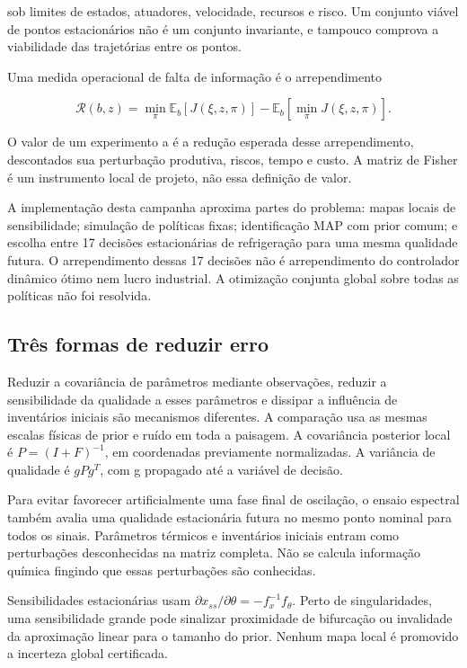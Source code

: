 \documentclass[
  11pt,
  letterpaper,
]{article}
\begin{document}
sob limites de estados, atuadores, velocidade, recursos e risco. Um
conjunto viável de pontos estacionários não é um conjunto invariante, e
tampouco comprova a viabilidade das trajetórias entre os pontos.

Uma medida operacional de falta de informação é o arrependimento

\[
\mathcal R(b,z)=\min_{\pi}\mathbb E_b[J(\xi,z,\pi)]
 -\mathbb E_b[\min_{\pi}J(\xi,z,\pi)] .
\]

O valor de um experimento a é a redução esperada desse arrependimento,
descontados sua perturbação produtiva, riscos, tempo e custo. A matriz
de Fisher é um instrumento local de projeto, não essa definição de
valor.

A implementação desta campanha aproxima partes do problema: mapas locais
de sensibilidade; simulação de políticas fixas; identificação MAP com
prior comum; e escolha entre 17 decisões estacionárias de refrigeração
para uma mesma qualidade futura. O arrependimento dessas 17 decisões não
é arrependimento do controlador dinâmico ótimo nem lucro industrial. A
otimização conjunta global sobre todas as políticas não foi resolvida.

\hypertarget{truxeas-formas-de-reduzir-erro}{%
\subsection{Três formas de reduzir
erro}\label{truxeas-formas-de-reduzir-erro}}

Reduzir a covariância de parâmetros mediante observações, reduzir a
sensibilidade da qualidade a esses parâmetros e dissipar a influência de
inventários iniciais são mecanismos diferentes. A comparação usa as
mesmas escalas físicas de prior e ruído em toda a paisagem. A
covariância posterior local é \(P=(I+F)^{-1}\), em coordenadas
previamente normalizadas. A variância de qualidade é \(gPg^T\), com g
propagado até a variável de decisão.

Para evitar favorecer artificialmente uma fase final de oscilação, o
ensaio espectral também avalia uma qualidade estacionária futura no
mesmo ponto nominal para todos os sinais. Parâmetros térmicos e
inventários iniciais entram como perturbações desconhecidas na matriz
completa. Não se calcula informação química fingindo que essas
perturbações são conhecidas.

Sensibilidades estacionárias usam
\(\partial x_{ss}/\partial\theta=-f_x^{-1}f_\theta\). Perto de
singularidades, uma sensibilidade grande pode sinalizar proximidade de
bifurcação ou invalidade da aproximação linear para o tamanho do prior.
Nenhum mapa local é promovido a incerteza global certificada.
\end{document}
